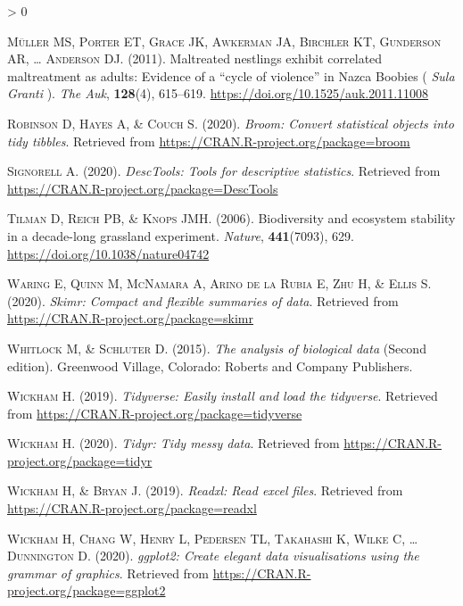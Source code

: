 \documentclass[
  a4paper,
]{article}
\newlength{\cslhangindent}
\newenvironment{CSLReferences}[2] %
 {%
  \setlength{\parindent}{0pt}
  \ifodd #1 \everypar{\setlength{\hangindent}{\cslhangindent}}\ignorespaces\fi
  \ifnum #2 > 0
  \setlength{\parskip}{#2\baselineskip}
  \fi
 }%
 {}
\begin{document}
\begin{CSLReferences}{1}{0}
\leavevmode\hypertarget{ref-muller2011}{}%
\textsc{Müller MS, Porter ET, Grace JK, Awkerman JA, Birchler KT, Gunderson AR, \ldots{} Anderson DJ}. (2011). Maltreated nestlings exhibit correlated maltreatment as adults: {Evidence} of a {``cycle of violence''} in {Nazca Boobies} ( {\emph{Sula}}{ \emph{Granti}} ). \emph{The Auk}, \textbf{128}(4), 615--619. \url{https://doi.org/10.1525/auk.2011.11008}

\leavevmode\hypertarget{ref-R-broom}{}%
\textsc{Robinson D, Hayes A, \& Couch S}. (2020). \emph{Broom: Convert statistical objects into tidy tibbles}. Retrieved from \url{https://CRAN.R-project.org/package=broom}

\leavevmode\hypertarget{ref-R-DescTools}{}%
\textsc{Signorell A}. (2020). \emph{DescTools: Tools for descriptive statistics}. Retrieved from \url{https://CRAN.R-project.org/package=DescTools}

\leavevmode\hypertarget{ref-tilman2006}{}%
\textsc{Tilman D, Reich PB, \& Knops JMH}. (2006). Biodiversity and ecosystem stability in a decade-long grassland experiment. \emph{Nature}, \textbf{441}(7093), 629. \url{https://doi.org/10.1038/nature04742}

\leavevmode\hypertarget{ref-R-skimr}{}%
\textsc{Waring E, Quinn M, McNamara A, Arino de la Rubia E, Zhu H, \& Ellis S}. (2020). \emph{Skimr: Compact and flexible summaries of data}. Retrieved from \url{https://CRAN.R-project.org/package=skimr}

\leavevmode\hypertarget{ref-whitlock2015}{}%
\textsc{Whitlock M, \& Schluter D}. (2015). \emph{The analysis of biological data} (Second edition). Greenwood Village, Colorado: {Roberts and Company Publishers}.

\leavevmode\hypertarget{ref-R-tidyverse}{}%
\textsc{Wickham H}. (2019). \emph{Tidyverse: Easily install and load the tidyverse}. Retrieved from \url{https://CRAN.R-project.org/package=tidyverse}

\leavevmode\hypertarget{ref-R-tidyr}{}%
\textsc{Wickham H}. (2020). \emph{Tidyr: Tidy messy data}. Retrieved from \url{https://CRAN.R-project.org/package=tidyr}

\leavevmode\hypertarget{ref-R-readxl}{}%
\textsc{Wickham H, \& Bryan J}. (2019). \emph{Readxl: Read excel files}. Retrieved from \url{https://CRAN.R-project.org/package=readxl}

\leavevmode\hypertarget{ref-R-ggplot2}{}%
\textsc{Wickham H, Chang W, Henry L, Pedersen TL, Takahashi K, Wilke C, \ldots{} Dunnington D}. (2020). \emph{ggplot2: Create elegant data visualisations using the grammar of graphics}. Retrieved from \url{https://CRAN.R-project.org/package=ggplot2}


\end{CSLReferences}
\end{document}
